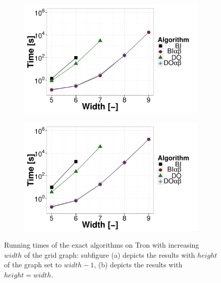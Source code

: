\begin{figure}[t!]
\centering
	\begin{subfigure}{0.49\textwidth}
		\includegraphics[width=1\textwidth]{figures/Tron-1.pdf}\caption{}\label{fig:off:res:tron1}
	\end{subfigure}
	\begin{subfigure}{0.49\textwidth}
		\includegraphics[width=1\textwidth]{figures/Tron-2.pdf}\caption{}\label{fig:off:res:tron2}
	\end{subfigure}
\caption{Running times of the exact algorithms on Tron with increasing $width$ of the grid graph: subfigure (a) depicts the results with $height$ of the graph set to $width - 1$, (b) depicts the results with $height = width$.} \label{fig:off:res:tron}
\end{figure}

